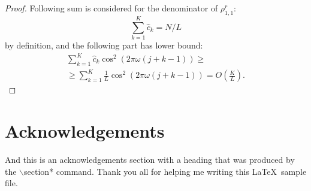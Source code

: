 \documentclass[sii]{ipart}
\begin{document}
\begin{proof}
	Following sum is considered for the denominator of $\rho^r_{1,1}$:
	\begin{equation*}
	\sum_{k=1}^K \hat c_k = N / L
	\end{equation*}
	by definition, and the following part has lower bound:
	\begin{multline*}
	\sum_{k=1}^K \hat c_k\cos^2(2 \pi \omega (j + k - 1)) \ge \\ \ge \sum_{k=1}^K \frac{1}{L}\cos^2(2 \pi \omega (j + k - 1)) = O \left(\frac{K}{L} \right).
	\end{multline*}
\end{proof}

\section*{Acknowledgements}
And this is an acknowledgements section with a heading that was produced by the
$\backslash$section* command. Thank you all for helping me writing this
\LaTeX\ sample file.



\end{document}
